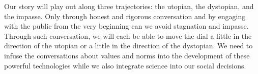Our story will play out along three trajectories: the utopian, the dystopian, and the impasse.
Only through honest and rigorous conversation and by engaging with the public from the very beginning can we avoid stagnation and impasse.
Through such conversation, we will each be able to move the dial a little in the direction of the utopian or a little in the direction of the dystopian.
We need to infuse the conversations about values and norms into the development of these powerful technologies while we also integrate science into our social decisions.
